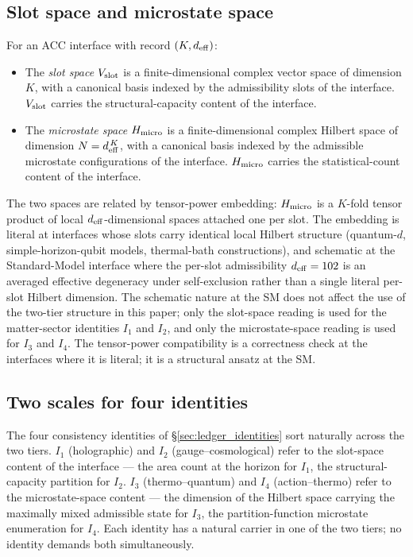 \documentclass[11pt]{article}
\begin{document}
\subsection{Slot space and microstate space}\label{sec:two_tier_definitions}

\begin{tcolorbox}[defbox, title={Definition --- Slot space and microstate space}]
For an ACC interface with record $(K, d_{\rm eff})$:
\begin{itemize}[leftmargin=2em,itemsep=4pt]
    \item The \emph{slot space} $V_{\rm slot}$ is a finite-dimensional complex vector space of dimension $K$, with a canonical basis indexed by the admissibility slots of the interface. $V_{\rm slot}$ carries the structural-capacity content of the interface.
    \item The \emph{microstate space} $H_{\rm micro}$ is a finite-dimensional complex Hilbert space of dimension $N = d_{\rm eff}^{\,K}$, with a canonical basis indexed by the admissible microstate configurations of the interface. $H_{\rm micro}$ carries the statistical-count content of the interface.
\end{itemize}
\end{tcolorbox}

The two spaces are related by tensor-power embedding: $H_{\rm micro}$ is a $K$-fold tensor product of local $d_{\rm eff}$-dimensional spaces attached one per slot. The embedding is literal at interfaces whose slots carry identical local Hilbert structure (quantum-$d$, simple-horizon-qubit models, thermal-bath constructions), and schematic at the Standard-Model interface where the per-slot admissibility $d_{\rm eff} = 102$ is an averaged effective degeneracy under self-exclusion rather than a single literal per-slot Hilbert dimension. The schematic nature at the SM does not affect the use of the two-tier structure in this paper; only the slot-space reading is used for the matter-sector identities $I_1$ and $I_2$, and only the microstate-space reading is used for $I_3$ and $I_4$. The tensor-power compatibility is a correctness check at the interfaces where it is literal; it is a structural ansatz at the SM.

\subsection{Two scales for four identities}\label{sec:two_tier_scales}

The four consistency identities of \S\ref{sec:ledger_identities} sort naturally across the two tiers. $I_1$ (holographic) and $I_2$ (gauge--cosmological) refer to the slot-space content of the interface --- the area count at the horizon for $I_1$, the structural-capacity partition for $I_2$. $I_3$ (thermo--quantum) and $I_4$ (action--thermo) refer to the microstate-space content --- the dimension of the Hilbert space carrying the maximally mixed admissible state for $I_3$, the partition-function microstate enumeration for $I_4$. Each identity has a natural carrier in one of the two tiers; no identity demands both simultaneously.
\end{document}
